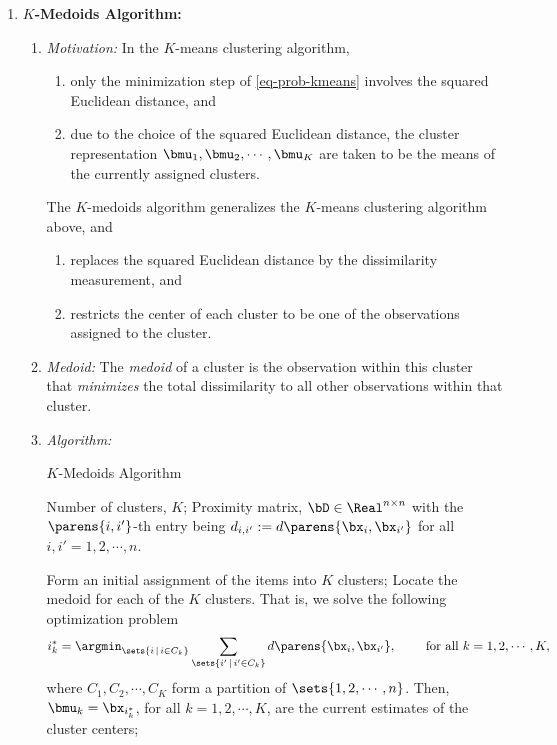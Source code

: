 \documentclass[12pt]{article}
\begin{document}
\begin{enumerate}[label=\textbf{\arabic*.}]
	\item \textbf{$K$-Medoids Algorithm:}
	\begin{enumerate}
		
		\item \textit{Motivation:} In the $K$-means clustering algorithm, 
		\begin{enumerate}
			\item only the minimization step of \eqref{eq-prob-kmeans} involves the squared Euclidean distance, and 
			\item due to the choice of the squared Euclidean distance, the cluster representation $\bmu_1, \bmu_2, \cdots, \bmu_K$ are taken to be the means of the currently assigned clusters. 
		\end{enumerate}
		The $K$-medoids algorithm generalizes the $K$-means clustering algorithm above, and 
		\begin{enumerate}
			\item replaces the squared Euclidean distance by the dissimilarity measurement, and 
			\item restricts the center of each cluster to be one of the observations assigned to the cluster. 
		\end{enumerate} 
		
		\item \textit{Medoid:} The \emph{medoid} of a cluster is the observation within this cluster that \emph{minimizes} the total dissimilarity to all other observations within that cluster. 
		
		\item \textit{Algorithm:}
		
		\begin{minipage}{\linewidth}
			\begin{algorithm}[H]
				\caption{$K$-Medoids Algorithm}\label{algo-k-medoids}
				\begin{algorithmic}[1]
					\REQUIRE Number of clusters, $K$; 
					\REQUIRE Proximity matrix, $\bD \in \Real^{n \times n}$ with the $\parens{i, i'}$-th entry being $d_{i, i'} := d \parens{\bx_i, \bx_{i'}}$ for all $i, i' = 1, 2, \cdots, n$. 
					
					\STATE Form an initial assignment of the items into $K$ clusters; 
					\STATE \label{algo-step-kmedoids-2} Locate the medoid for each of the $K$ clusters. That is, we solve the following optimization problem 
					\begin{align*}
						i_k^* = \argmin_{\sets{i \,\vert\, i \in C_k}} \sum_{\sets{i' \,\vert\, i' \in C_k}} d \parens{\bx_i, \bx_{i'}}, \qquad \text{ for all } k = 1, 2, \cdots, K, 
					\end{align*}
					where $C_1, C_2, \cdots, C_K$ form a partition of $\sets{1, 2, \cdots, n}$. Then, $\bmu_k = \bx_{i_k^*}$, for all $k = 1, 2, \cdots, K$, are the current estimates of the cluster centers; 
					

\end{algorithmic}
\end{algorithm}
\end{minipage}
\end{enumerate}
\end{enumerate}
\end{document}
